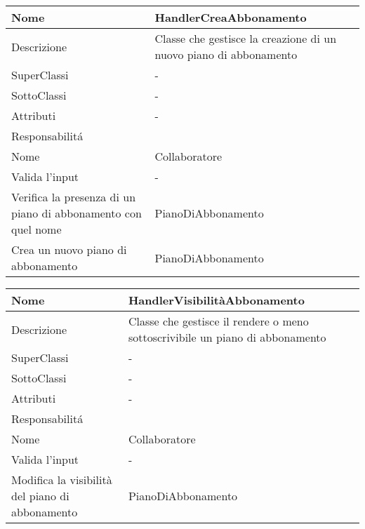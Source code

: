 \begin{center}
    \begin{longtable}{ |p{3cm}|p{3cm}|p{3cm}|p{3cm}| }
        \hline
        Nome & \multicolumn{3}{|p{9cm}|}{HandlerCreaAbbonamento} \\\hline
        Descrizione & \multicolumn{3}{|p{9cm}|}{Classe che gestisce la creazione di un nuovo piano di abbonamento} \\\hline
        SuperClassi & \multicolumn{3}{|p{9cm}|}{-} \\\hline
        SottoClassi & \multicolumn{3}{|p{9cm}|}{-} \\\hline
        Attributi & \multicolumn{3}{|p{9cm}|}{-} \\\hline
        \multicolumn{4}{|p{12cm}|}{Responsabilit\'a} \\\hline
        \multicolumn{2}{|p{6cm}|}{Nome} & \multicolumn{2}{|p{6cm}|}{Collaboratore} \\\hline
        \multicolumn{2}{|p{6cm}|}{Valida l'input} & \multicolumn{2}{|p{6cm}|}{-} \\\hline
        \multicolumn{2}{|p{6cm}|}{Verifica la presenza di un piano di abbonamento con quel nome} & \multicolumn{2}{|p{6cm}|}{PianoDiAbbonamento} \\\hline
        \multicolumn{2}{|p{6cm}|}{Crea un nuovo piano di abbonamento} & \multicolumn{2}{|p{6cm}|}{PianoDiAbbonamento} \\\hline
    \end{longtable}
\end{center}

\begin{center}
    \begin{longtable}{ |p{3cm}|p{3cm}|p{3cm}|p{3cm}| }
        \hline
        Nome & \multicolumn{3}{|p{9cm}|}{HandlerVisibilitàAbbonamento} \\\hline
        Descrizione & \multicolumn{3}{|p{9cm}|}{Classe che gestisce il rendere o meno sottoscrivibile un piano di abbonamento} \\\hline
        SuperClassi & \multicolumn{3}{|p{9cm}|}{-} \\\hline
        SottoClassi & \multicolumn{3}{|p{9cm}|}{-} \\\hline
        Attributi & \multicolumn{3}{|p{9cm}|}{-} \\\hline
        \multicolumn{4}{|p{12cm}|}{Responsabilit\'a} \\\hline
        \multicolumn{2}{|p{6cm}|}{Nome} & \multicolumn{2}{|p{6cm}|}{Collaboratore} \\\hline
        \multicolumn{2}{|p{6cm}|}{Valida l'input} & \multicolumn{2}{|p{6cm}|}{-} \\\hline
        \multicolumn{2}{|p{6cm}|}{Modifica la visibilità del piano di abbonamento} & \multicolumn{2}{|p{6cm}|}{PianoDiAbbonamento} \\\hline
    \end{longtable}
\end{center}


